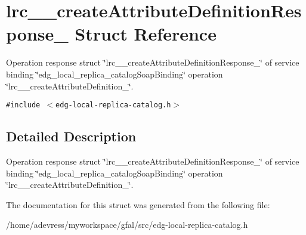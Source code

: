 \section{lrc\_\-\_\-create\-Attribute\-Definition\-Response\_\- Struct Reference}
\label{structlrc____createAttributeDefinitionResponse__}
Operation response struct \char`\"{}lrc\_\-\_\-create\-Attribute\-Definition\-Response\_\-\char`\"{} of service binding \char`\"{}edg\_\-local\_\-replica\_\-catalog\-Soap\-Binding\char`\"{} operation \char`\"{}lrc\_\-\_\-create\-Attribute\-Definition\_\-\char`\"{}.  


{\tt \#include $<$edg-local-replica-catalog.h$>$}



\subsection{Detailed Description}
Operation response struct \char`\"{}lrc\_\-\_\-create\-Attribute\-Definition\-Response\_\-\char`\"{} of service binding \char`\"{}edg\_\-local\_\-replica\_\-catalog\-Soap\-Binding\char`\"{} operation \char`\"{}lrc\_\-\_\-create\-Attribute\-Definition\_\-\char`\"{}. 



The documentation for this struct was generated from the following file:\begin{CompactItemize}
\item 
/home/adevress/myworkspace/gfal/src/edg-local-replica-catalog.h\end{CompactItemize}
